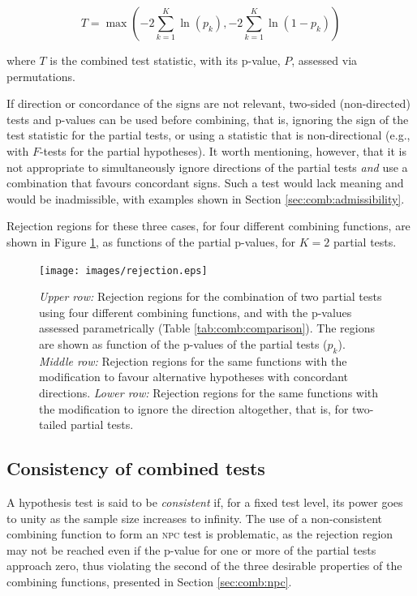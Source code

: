 \begin{equation}
T = \max\left(-2\sum_{k=1}^{K} \ln\left(p_{k}\right),-2\sum_{k=1}^{K} \ln\left(1-p_{k}\right)\right)
\label{eqn:comb:pearson-david}
\end{equation}

\noindent
where $T$ is the combined test statistic, with its p-value, $P$, assessed via permutations.

If direction or concordance of the signs are not relevant, two-sided (non-directed) tests and p-values can be used before combining, that is, ignoring the sign of the test statistic for the partial tests, or using a statistic that is non-directional (e.g., with $F$-tests for the partial hypotheses). It worth mentioning, however, that it is not appropriate to simultaneously ignore directions of the partial tests \emph{and} use a combination that favours concordant signs. Such a test would lack meaning and would be inadmissible, with examples shown in Section \ref{sec:comb:admissibility}. 

Rejection regions for these three cases, for four different combining functions, are shown in Figure \ref{fig:comb:rejection}, as functions of the partial p-values, for $K=2$ partial tests.

\begin{figure}[p]
\begin{center}
\centerline{\texttt{[image: images/rejection.eps]}}
\end{center}
\caption[Rejection regions of two partial tests with four different combining functions.]{
\emph{Upper row:} Rejection regions for the combination of two partial tests using four different combining functions, and with the p-values assessed parametrically (Table \ref{tab:comb:comparison}). The regions are shown as function of the p-values of the partial tests ($p_k$).
\emph{Middle row:} Rejection regions for the same functions with the modification to favour alternative hypotheses with concordant directions.
\emph{Lower row:} Rejection regions for the same functions with the modification to ignore the direction altogether, that is, for two-tailed partial tests.}
\label{fig:comb:rejection}
\end{figure}

\subsection{Consistency of combined tests}
\label{sec:comb:consistency}

A hypothesis test is said to be \emph{consistent} if, for a fixed test level, its power goes to unity as the sample size increases to infinity. The use of a non-consistent combining function to form an \textsc{npc} test is problematic, as the rejection region may not be reached even if the p-value for one or more of the partial tests approach zero, thus violating the second of the three desirable properties of the combining functions, presented in Section \ref{sec:comb:npc}.

